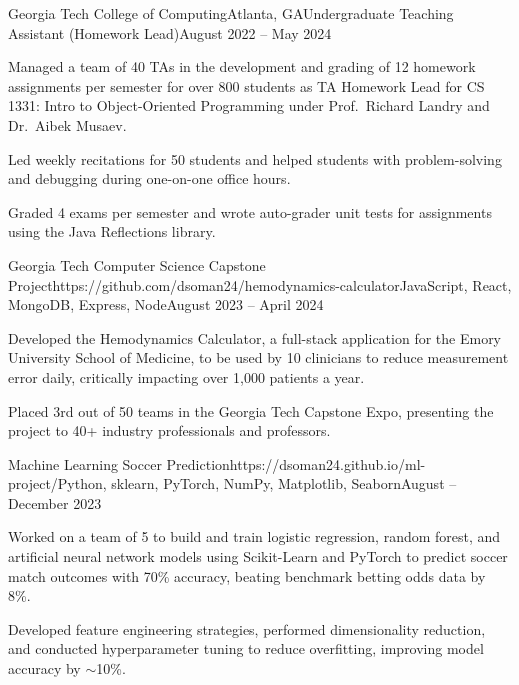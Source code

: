 \documentclass{article}
\begin{document}
\begin{flushleft}
    \begin{experience}{Georgia Tech College of Computing}{Atlanta, GA}{Undergraduate Teaching Assistant (Homework Lead)}{August 2022 -- May 2024}
        \item Managed a team of 40 TAs in the development and grading of 12 homework assignments per semester for over 800 students as TA Homework Lead for CS 1331: Intro to Object-Oriented Programming under Prof.~Richard Landry and Dr.~Aibek Musaev.
        \item Led weekly recitations for 50 students and helped students with problem-solving and debugging during one-on-one office hours.
        \item Graded 4 exams per semester and wrote auto-grader unit tests for assignments using the Java Reflections library.
    \end{experience}


    \vspace{3pt}

    \begin{project}{Georgia Tech Computer Science Capstone Project}{https://github.com/dsoman24/hemodynamics-calculator}{JavaScript, React, MongoDB, Express, Node}{August 2023 -- April 2024}
        \item Developed the Hemodynamics Calculator, a full-stack application for the Emory University School of Medicine, to be used by 10 clinicians to reduce measurement error daily, critically impacting over 1,000 patients a year.
        \item Placed 3rd out of 50 teams in the Georgia Tech Capstone Expo, presenting the project to 40+ industry professionals and professors.
    \end{project}

    \begin{project}{Machine Learning Soccer Prediction}{https://dsoman24.github.io/ml-project/}{Python, sklearn, PyTorch, NumPy, Matplotlib, Seaborn}{August -- December 2023}
        \item Worked on a team of 5 to build and train logistic regression, random forest, and artificial neural network models using Scikit-Learn and PyTorch to predict soccer match outcomes with 70\% accuracy, beating benchmark betting odds data by 8\%.
        \item Developed feature engineering strategies, performed dimensionality reduction, and conducted hyperparameter tuning to reduce overfitting, improving model accuracy by $\sim$10\%.
    \end{project}


\end{flushleft}
\end{document}
